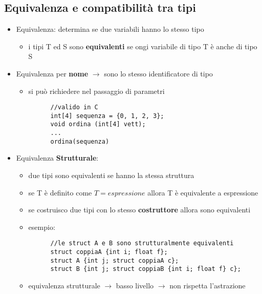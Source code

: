 \documentclass[12pt]{extarticle}
\begin{document}
\begin{flushleft}
\smallskip

\section*{Equivalenza e compatibilità tra tipi}
\begin{itemize}
  \item Equivalenza: determina se due variabili hanno lo stesso tipo
  \begin{itemize}
    \item i tipi T ed S sono \textbf{equivalenti} se ongi variabile di tipo T è anche di tipo S
  \end{itemize}
  \item Equivalenza per \textbf{nome} $\rightarrow$ sono lo stesso identificatore di tipo
  \begin{itemize}
    \item si può richiedere nel passaggio di parametri
    \begin{lstlisting}
      //valido in C
      int[4] sequenza = {0, 1, 2, 3};
      void ordina (int[4] vett);
      ...
      ordina(sequenza)
    \end{lstlisting}
  \end{itemize}
\end{itemize}

\newpage

\begin{itemize}
  \item Equivalenza \textbf{Strutturale}:
  \begin{itemize}
    \item due tipi sono equivalenti se hanno la stessa struttura
    \item se T è definito come $T = espressione$ allora T è equivalente a espressione
    \item se costruisco due tipi con lo stesso \textbf{costruttore} allora sono equivalenti
    \item esempio:
    \begin{lstlisting}
      //le struct A e B sono strutturalmente equivalenti
      struct coppiaA {int i; float f};
      struct A {int j; struct coppiaA c};
      struct B {int j; struct coppiaB {int i; float f} c};
    \end{lstlisting} 
    \item equivalenza strutturale $\rightarrow$ basso livello $\rightarrow$ non rispetta l'astrazione
  \end{itemize}
\end{itemize}


\end{flushleft}
\end{document}
